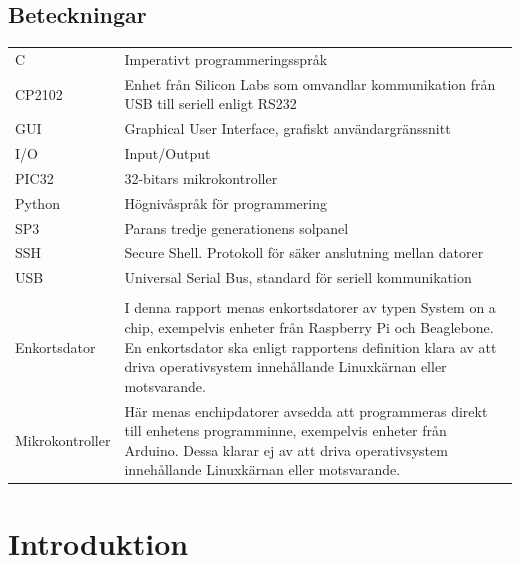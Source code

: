 \documentclass{article}
\begin{document}
    \subsection*{Beteckningar} %
    \label{sub:beteckningar}
        \begin{tabularx}{\textwidth}{@{}lX}
            C & Imperativt programmeringsspråk \\
            CP2102 & Enhet från Silicon Labs som omvandlar kommunikation från
            USB till seriell enligt RS232\\
            GUI & Graphical User Interface, grafiskt användargränssnitt \\
            I/O & Input/Output \\
            PIC32 & 32-bitars mikrokontroller \\
            Python & Högnivåspråk för programmering \\
            SP3 & Parans tredje generationens solpanel \\
            SSH & Secure Shell. Protokoll för säker anslutning mellan datorer\\
            USB & Universal Serial Bus, standard för seriell kommunikation \\
            \\
            Enkortsdator & I denna rapport menas enkortsdatorer av typen System
            on a chip, exempelvis enheter från Raspberry Pi och Beagle\-bone. 
            En enkortsdator ska enligt rapportens definition klara av att driva 
            operativsystem innehållande Linuxkärnan eller mot\-svarande. \\
            Mikrokontroller & Här menas enchipdatorer avsedda att programmeras 
            direkt till enhetens programminne, exempelvis enheter från 
            \hbox{Arduino}. Dessa klarar ej av att driva operativsystem 
            innehållande Linux\-kärnan eller motsvarande.\\
            

        \end{tabularx}
    \newpage

    \tableofcontents
    \listoffigures

    \newpage

    \section{Introduktion} %
    \label{sec:introduktion}
\end{document}
